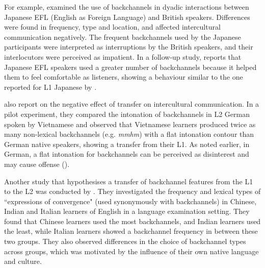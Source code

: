 For example, \citet{Cutrone2005} examined the use of backchannels in dyadic interactions between Japanese EFL (English as Foreign Language) and British speakers. Differences were found in frequency, type and location, and affected intercultural communication negatively. The frequent backchannels used by the Japanese participants were interpreted as interruptions by the British speakers, and their interlocutors were perceived as impatient. In a follow-up study, \citet{Cutrone2014} reports that Japanese EFL speakers used a greater number of backchannels because it helped them to feel comfortable as listeners, showing a behaviour similar to the one reported for L1 Japanese by \citet{ClancyEtAl1996}.

\citet{WehrleGrice2019} also report on the negative effect of transfer on intercultural communication. In a pilot experiment, they compared the intonation of backchannels in L2 German spoken by Vietnamese and observed that Vietnamese learners produced twice as many non-lexical backchannels (e.g. \textit{mmhm}) with a flat intonation contour than German native speakers, showing a transfer from their L1. As noted earlier, in German, a flat intonation for backchannels can be perceived as disinterest and may cause offense (\citealt{EbnerGrice2016}).

Another study that hypothesises a transfer of backchannel features from the L1 to the L2 was conducted by \citet{CastelloGesuato2019}. They investigated the frequency and lexical types of ``expressions of convergence" (used synonymously with backchannels) in Chinese, Indian and Italian learners of English in a language examination setting. They found that Chinese learners used the most backchannels, and Indian learners used the least, while Italian learners showed a backchannel frequency in between these two groups. They also observed differences in the choice of backchannel types across groups, which was motivated by the influence of their own native language and culture.

